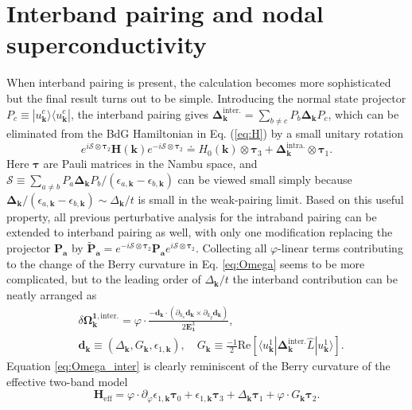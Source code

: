 \section{Interband pairing and nodal superconductivity}
When interband pairing is present, the calculation becomes more sophisticated but the final result turns out to be simple. Introducing the normal state projector $P_c\equiv |u^c_{\bm{k}}\rangle\langle u^c_{\bm{k}}|$, the interband pairing gives $\boldsymbol\Delta_{\bm{k}}^{\text{inter.}}=\sum_{b\neq c}P_b \boldsymbol\Delta_{\bm{k}} P_c$, which can be eliminated from the BdG Hamiltonian in Eq. (\ref{eq:H}) by a small unitary rotation 
\begin{equation}
    e^{i\mathcal S\otimes\bm\tau_2}\mathbf H(\bm k) e^{-i\mathcal S\otimes\bm\tau_2}\doteq H_0(\bm k)\otimes\bm\tau_3 + \boldsymbol\Delta_{\bm k}^{\text{intra.}}\otimes\bm\tau_1 .
\end{equation}
Here $\bm\tau$ are Pauli matrices in the Nambu space, and $\mathcal S \equiv \sum_{a\neq b}P_a\boldsymbol\Delta_{\bm k}P_b/(\epsilon_{a,\bm k}-\epsilon_{b,\bm k})$ can be viewed small simply because $\boldsymbol\Delta_{\bm k}/(\epsilon_{a,\bm k}-\epsilon_{b,\bm k})\sim\varDelta_{\bm k}/t$ is small in the weak-pairing limit. Based on this useful property, all previous perturbative analysis for the intraband pairing can be extended to interband pairing as well, with only one modification replacing the projector $\mathbf P_{\mathbf a}$ by $\widetilde{\mathbf P}_{\mathbf a} = e^{-i\mathcal S\otimes\bm\tau_2}\mathbf P_{\mathbf a} e^{i\mathcal S\otimes\bm\tau_2}$. Collecting all $\varphi$-linear terms contributing to the change of the Berry curvature in Eq. \eqref{eq:Omega} seems to be more complicated, but to the leading order of $\varDelta_{\bm k}/t$ the interband contribution can be neatly arranged as \cite{SM}
\begin{align}
	&\delta \boldsymbol\Omega^{\mathbf 1,\text{inter.}}_{\bm{k}}=\varphi\cdot\frac{- {\mathbf d}_{\bm{k}}\cdot(\partial_{k_x}{\mathbf d}_{\bm{k}}\times \partial_{k_y} {\mathbf d}_{\bm{k}})}{2\mathbf E^3_\mathbf 1},\label{eq:Omega_inter} \\
    &{\mathbf d}_{\bm{k}}\equiv(\varDelta_{\bm{k}}, G_{\bm{k}},\epsilon_{1,\bm{k}}),\quad G_{\bm{k}}\equiv\frac{-1}{2}\mbox{Re}[\langle u^1_{\bm{k}}|\boldsymbol{\Delta}^{\text{inter.}}_{\bm{k}}\hat L|u^1_{\bm{k}}\rangle].\nonumber
\end{align}
Equation \eqref{eq:Omega_inter} is clearly reminiscent of the Berry curvature of the effective two-band model%
\begin{equation}\label{eq:H_eff}
	\mathbf H_{\text{eff}}=\varphi\cdot\partial_\varphi \epsilon_{1,\bm{k}}\boldsymbol\tau_0+\epsilon_{1,\bm{k}}\boldsymbol\tau_3+\varDelta_{\bm{k}}\boldsymbol\tau_1+\varphi\cdot G_{\bm{k}}\boldsymbol\tau_2.
\end{equation}
